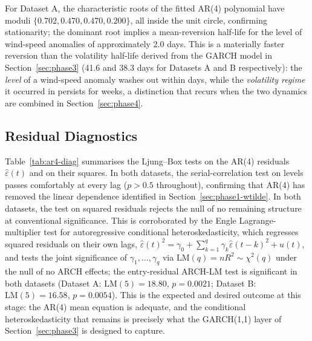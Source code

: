 \documentclass[11pt, a4paper, twoside]{article}
\begin{document}
For Dataset A, the characteristic roots of the fitted AR(4) polynomial have moduli $\{0.702, 0.470, 0.470, 0.200\}$, all inside the unit circle, confirming stationarity; the dominant root implies a mean-reversion half-life for the level of wind-speed anomalies of approximately 2.0 days. This is a materially faster reversion than the volatility half-life derived from the GARCH model in Section~\ref{sec:phase3} (41.6 and 38.3 days for Datasets A and B respectively): the \emph{level} of a wind-speed anomaly washes out within days, while the \emph{volatility regime} it occurred in persists for weeks, a distinction that recurs when the two dynamics are combined in Section~\ref{sec:phase4}.

\subsection{Residual Diagnostics}
\label{sec:phase2-diag}

Table~\ref{tab:ar4-diag} summarises the Ljung--Box tests on the AR(4) residuals $\hat\varepsilon(t)$ and on their squares. In both datasets, the serial-correlation test on levels passes comfortably at every lag ($p > 0.5$ throughout), confirming that AR(4) has removed the linear dependence identified in Section~\ref{sec:phase1-wtilde}. In both datasets, the test on squared residuals rejects the null of no remaining structure at conventional significance. This is corroborated by the Engle \citeyearpar{Engle1982} Lagrange-multiplier test for autoregressive conditional heteroskedasticity, which regresses squared residuals on their own lags, $\hat\varepsilon(t)^2 = \gamma_0 + \sum_{k=1}^q \gamma_k \hat\varepsilon(t-k)^2 + u(t)$, and tests the joint significance of $\gamma_1,\dots,\gamma_q$ via $\text{LM}(q) = nR^2 \sim \chi^2(q)$ under the null of no ARCH effects; the entry-residual ARCH-LM test is significant in both datasets (Dataset A: $\text{LM}(5) = 18.80$, $p = 0.0021$; Dataset B: $\text{LM}(5) = 16.58$, $p = 0.0054$). This is the expected and desired outcome at this stage: the AR(4) mean equation is adequate, and the conditional heteroskedasticity that remains is precisely what the GARCH(1,1) layer of Section~\ref{sec:phase3} is designed to capture.
\end{document}
